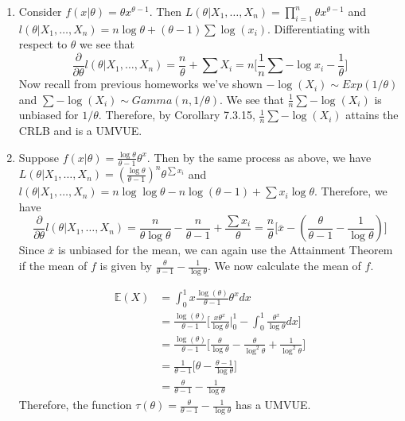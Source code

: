 \documentclass[12pt]{article}  %
\newcommand{\E}{{\mathbb{E}}}
\begin{document}
\begin{enumerate}
\begin{enumerate}
	\item Consider $f(x|\theta) = \theta x^{\theta - 1}$. Then $L(\theta|X_1,\ldots, X_n) = \prod_{i=1}^n \theta x^{\theta-1}$ and $l(\theta|X_1, \ldots, X_n) = n\log\theta + (\theta -1)\sum\log(x_i)$. Differentiating with respect to $\theta$ we see that $$\frac{\partial}{\partial\theta}l(\theta|X_1, \ldots, X_n) = \frac{n}{\theta} + \sum X_i = n\Big[\frac{1}{n}\sum -\log x_i - \frac{1}{\theta}\Big]$$ Now recall from previous homeworks we've shown $-\log(X_i)\sim Exp(1/\theta)$ and $\sum -\log(X_i)\sim Gamma(n,1/\theta)$. We see that $\frac{1}{n}\sum-\log(X_i)$ is unbiased for $1/\theta$. Therefore, by Corollary 7.3.15, $\frac{1}{n}\sum -\log(X_i)$ attains the CRLB and is a UMVUE.
	\item Suppose $f(x|\theta) = \frac{\log\theta}{\theta -1}\theta^x$. Then by the same process as above, we have $L(\theta|X_1, \ldots, X_n) = \left(\frac{\log\theta}{\theta - 1}\right)^n\theta^{\sum x_i}$ and 
	$l(\theta|X_1,\ldots, X_n) = n\log\log\theta - n\log(\theta - 1) +\sum x_i\log\theta$. Therefore, we have $$\frac{\partial}{\partial\theta}l(\theta|X_1, \ldots, X_n) = \frac{n}{\theta\log\theta}-\frac{n}{\theta-1} + \frac{\sum x_i}{\theta} = \frac{n}{\theta}\Big[\overline{x} - \left(\frac{\theta}{\theta-1}-\frac{1}{\log\theta}\right)\Big]$$ Since $\overline{x}$ is unbiased for the mean, we can again use the Attainment Theorem if the mean of $f$ is given by $\frac{\theta}{\theta-1}-\frac{1}{\log\theta}$. We now calculate the mean of $f$. 

	\begin{align*}
	\E(X) &= \int_0^1 x\frac{\log(\theta)}{\theta-1}\theta^xdx\\
	&= \frac{\log(\theta)}{\theta-1}\Big[\frac{x\theta^{x}}{\log\theta}\big|_{0}^1 - \int_0^1\frac{\theta^x}{\log\theta}dx\Big]\\
	&= \frac{\log(\theta)}{\theta-1}\Big[\frac{\theta}{\log\theta} - \frac{\theta}{\log^2\theta} + \frac{1}{\log^2\theta}\Big]\\
	&= \frac{1}{\theta - 1}\Big[\theta - \frac{\theta - 1}{\log\theta}\Big]\\
	&= \frac{\theta}{\theta-1} - \frac{1}{\log\theta}
	\end{align*}
	Therefore, the function $\tau(\theta) = \frac{\theta}{\theta - 1} - \frac{1}{\log\theta}$ has a UMVUE. 
	\end{enumerate}	



\end{enumerate}
\end{document}
